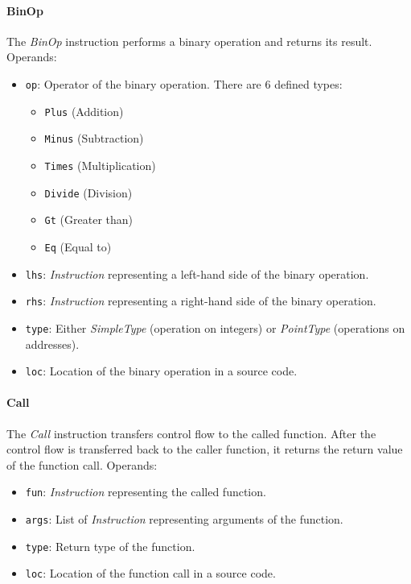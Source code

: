 \documentclass[thesis=M,english]{FITthesis}[2019/12/23]
\begin{document}
\paragraph*{BinOp} The \emph{BinOp} instruction performs a binary operation and returns its result. Operands:
\begin{itemize}
    \item \texttt{op}: Operator of the binary operation. There are 6 defined types:
    \begin{itemize}
        \item \texttt{Plus} (Addition)
        \item \texttt{Minus} (Subtraction)
        \item \texttt{Times} (Multiplication)
        \item \texttt{Divide} (Division)
        \item \texttt{Gt} (Greater than)
        \item \texttt{Eq} (Equal to)
    \end{itemize}
    \item \texttt{lhs}: \emph{Instruction} representing a left-hand side of the binary operation.
    \item \texttt{rhs}: \emph{Instruction} representing a right-hand side of the binary operation.
    \item \texttt{type}: Either \emph{SimpleType} (operation on integers) or \emph{PointType} (operations on addresses).
    \item \texttt{loc}: Location of the binary operation in a source code.
\end{itemize}

\paragraph*{Call} The \emph{Call} instruction transfers control flow to the called function. After the control flow is transferred back to the caller function, it returns the return value of the function call. Operands:
\begin{itemize}
    \item \texttt{fun}: \emph{Instruction} representing the called function.
    \item \texttt{args}: List of \emph{Instruction} representing arguments of the function.
    \item \texttt{type}: Return type of the function.
    \item \texttt{loc}: Location of the function call in a source code.
\end{itemize}
\end{document}
